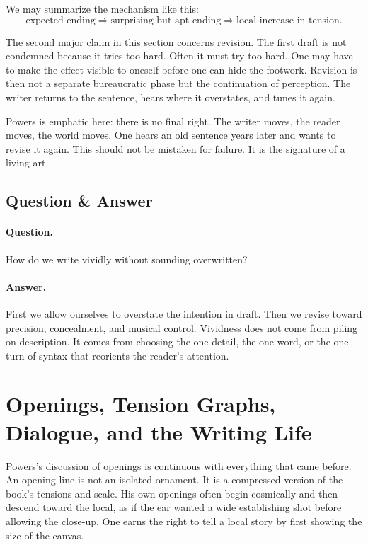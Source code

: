 We may summarize the mechanism like this:
\begin{equation}
\text{expected ending} \Longrightarrow \text{surprising but apt ending} \Longrightarrow \text{local increase in tension}.
\end{equation}

The second major claim in this section concerns revision. The first draft is not condemned because it tries too hard. Often it must try too hard. One may have to make the effect visible to oneself before one can hide the footwork. Revision is then not a separate bureaucratic phase but the continuation of perception. The writer returns to the sentence, hears where it overstates, and tunes it again.

Powers is emphatic here: there is no final right. The writer moves, the reader moves, the world moves. One hears an old sentence years later and wants to revise it again. This should not be mistaken for failure. It is the signature of a living art.

\subsection{Question \& Answer}

\paragraph{Question.} How do we write vividly without sounding overwritten?

\paragraph{Answer.} First we allow ourselves to overstate the intention in draft. Then we revise toward precision, concealment, and musical control. Vividness does not come from piling on description. It comes from choosing the one detail, the one word, or the one turn of syntax that reorients the reader's attention.

\section{Openings, Tension Graphs, Dialogue, and the Writing Life}

Powers's discussion of openings is continuous with everything that came before. An opening line is not an isolated ornament. It is a compressed version of the book's tensions and scale. His own openings often begin cosmically and then descend toward the local, as if the ear wanted a wide establishing shot before allowing the close-up. One earns the right to tell a local story by first showing the size of the canvas.

